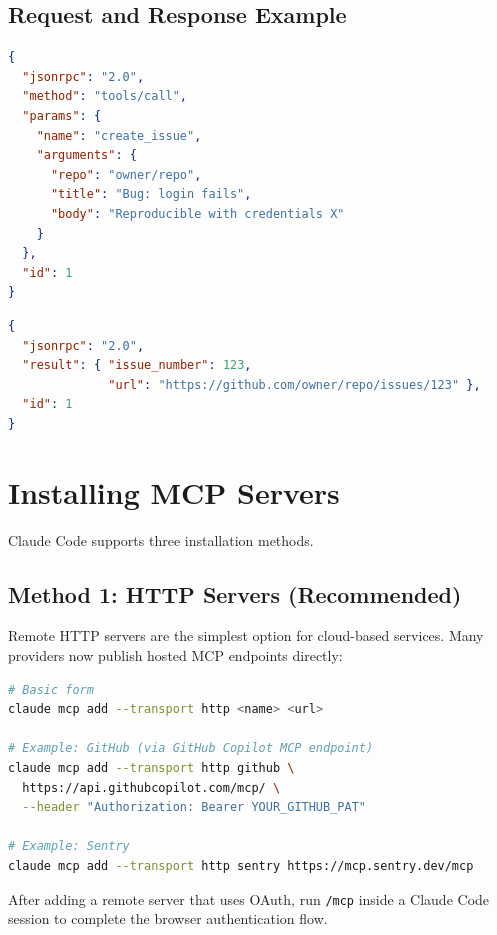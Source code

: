 \subsection{Request and Response Example}

\begin{lstlisting}[language=json,caption={MCP tool call (JSON-RPC 2.0)}]
{
  "jsonrpc": "2.0",
  "method": "tools/call",
  "params": {
    "name": "create_issue",
    "arguments": {
      "repo": "owner/repo",
      "title": "Bug: login fails",
      "body": "Reproducible with credentials X"
    }
  },
  "id": 1
}
\end{lstlisting}

\begin{lstlisting}[language=json,caption={MCP response}]
{
  "jsonrpc": "2.0",
  "result": { "issue_number": 123,
              "url": "https://github.com/owner/repo/issues/123" },
  "id": 1
}
\end{lstlisting}

\section{Installing MCP Servers}
\label{sec:mcp-install}


Claude Code supports three installation methods.

\subsection{Method 1: HTTP Servers (Recommended)}

Remote HTTP servers are the simplest option for cloud-based services. Many
providers now publish hosted MCP endpoints directly:

\begin{lstlisting}[language=bash,caption={Adding an HTTP MCP server}]
# Basic form
claude mcp add --transport http <name> <url>

# Example: GitHub (via GitHub Copilot MCP endpoint)
claude mcp add --transport http github \
  https://api.githubcopilot.com/mcp/ \
  --header "Authorization: Bearer YOUR_GITHUB_PAT"

# Example: Sentry
claude mcp add --transport http sentry https://mcp.sentry.dev/mcp
\end{lstlisting}

After adding a remote server that uses OAuth, run \texttt{/mcp} inside a
Claude Code session to complete the browser authentication flow.

